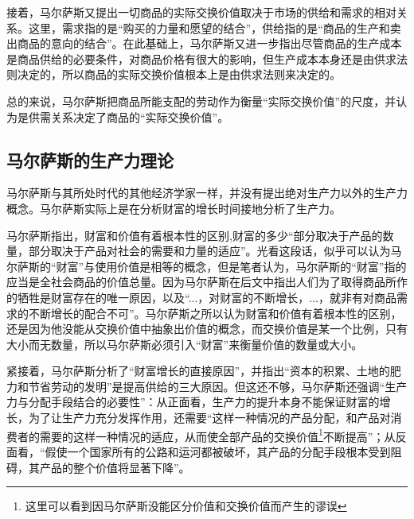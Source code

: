 接着，马尔萨斯又提出一切商品的实际交换价值取决于市场的供给和需求的相对关系\cite[43]{BiLuo*SiLaFaDaWeiLiJiaTuQuanJiDi2JuanMaErSaSiZhengZhiJingJiXueYuanLiPingZhu2013}。这里，需求指的是“购买的力量和愿望的结合”\cite[43]{BiLuo*SiLaFaDaWeiLiJiaTuQuanJiDi2JuanMaErSaSiZhengZhiJingJiXueYuanLiPingZhu2013}，供给指的是“商品的生产和卖出商品的意向的结合”\cite[43]{BiLuo*SiLaFaDaWeiLiJiaTuQuanJiDi2JuanMaErSaSiZhengZhiJingJiXueYuanLiPingZhu2013}。在此基础上，马尔萨斯又进一步指出尽管商品的生产成本是商品供给的必要条件，对商品价格有很大的影响\cite[50，55]{BiLuo*SiLaFaDaWeiLiJiaTuQuanJiDi2JuanMaErSaSiZhengZhiJingJiXueYuanLiPingZhu2013}，但生产成本本身还是由供求法则决定的，所以商品的实际交换价值根本上是由供求法则来决定的\cite[59]{BiLuo*SiLaFaDaWeiLiJiaTuQuanJiDi2JuanMaErSaSiZhengZhiJingJiXueYuanLiPingZhu2013}。

总的来说，马尔萨斯把商品所能支配的劳动作为衡量“实际交换价值”的尺度，并认为是供需关系决定了商品的“实际交换价值”。

\subsection{马尔萨斯的生产力理论}

马尔萨斯与其所处时代的其他经济学家一样，并没有提出绝对生产力以外的生产力概念。马尔萨斯实际上是在分析财富的增长时间接地分析了生产力。

马尔萨斯指出，财富和价值有着根本性的区别,财富的多少“部分取决于产品的数量，部分取决于产品对社会的需要和力量的适应”\cite[292]{BiLuo*SiLaFaDaWeiLiJiaTuQuanJiDi2JuanMaErSaSiZhengZhiJingJiXueYuanLiPingZhu2013}。光看这段话，似乎可以认为马尔萨斯的“财富”与使用价值是相等的概念，但是笔者认为，马尔萨斯的“财富”指的应当是全社会商品的价值总量。因为马尔萨斯在后文中指出人们为了取得商品所作的牺牲是财富存在的唯一原因\cite[292]{BiLuo*SiLaFaDaWeiLiJiaTuQuanJiDi2JuanMaErSaSiZhengZhiJingJiXueYuanLiPingZhu2013}，以及“...，对财富的不断增长，...，就非有对商品需求的不断增长的配合不可”\cite[355]{BiLuo*SiLaFaDaWeiLiJiaTuQuanJiDi2JuanMaErSaSiZhengZhiJingJiXueYuanLiPingZhu2013}。马尔萨斯之所以认为财富和价值有着根本性的区别，还是因为他没能从交换价值中抽象出价值的概念，而交换价值是某一个比例，只有大小而无数量，所以马尔萨斯必须引入“财富”来衡量价值的数量或大小。

紧接着，马尔萨斯分析了“财富增长的直接原因”，并指出“资本的积累、土地的肥力和节省劳动的发明”是提高供给的三大原因\cite[355]{BiLuo*SiLaFaDaWeiLiJiaTuQuanJiDi2JuanMaErSaSiZhengZhiJingJiXueYuanLiPingZhu2013}。但这还不够，马尔萨斯还强调“生产力与分配手段结合的必要性”\cite[356]{BiLuo*SiLaFaDaWeiLiJiaTuQuanJiDi2JuanMaErSaSiZhengZhiJingJiXueYuanLiPingZhu2013}：从正面看，生产力的提升本身不能保证财富的增长，为了让生产力充分发挥作用，还需要“这样一种情况的产品分配，和产品对消费者的需要的这样一种情况的适应，从而使全部产品的交换价值\footnote{这里可以看到因马尔萨斯没能区分价值和交换价值而产生的谬误}不断提高”\cite[356]{BiLuo*SiLaFaDaWeiLiJiaTuQuanJiDi2JuanMaErSaSiZhengZhiJingJiXueYuanLiPingZhu2013}；从反面看，“假使一个国家所有的公路和运河都被破坏，其产品的分配手段根本受到阻碍，其产品的整个价值将显著下降”\cite[357]{BiLuo*SiLaFaDaWeiLiJiaTuQuanJiDi2JuanMaErSaSiZhengZhiJingJiXueYuanLiPingZhu2013}。

